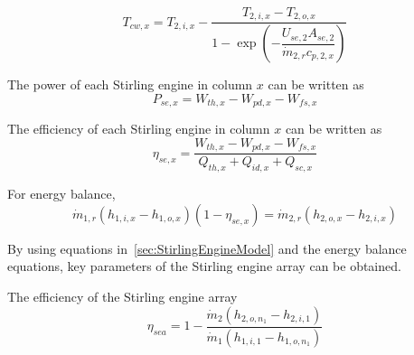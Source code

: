 \begin{equation}
	T_{cw,x}=T_{2,i,x}-\dfrac{T_{2,i,x}-T_{2,o,x}}{1-\exp(-\dfrac{U_{se,2}A_{se,2}}{\dot{m}_{2,r}c_{p,2,x}})}\label{eq:T_L_x}
\end{equation}

The power of each Stirling engine in column $x$ can be written as 
\begin{equation}
  P_{se,x} = W_{th,x}-W_{pd,x}-W_{fs,x}\end{equation}

The efficiency of each Stirling engine in column $x$ can be written as 
\begin{equation}
  \eta_{se,x} = \dfrac{W_{th,x}-W_{pd,x}-W_{fs,x}}{Q_{th,x}+Q_{id,x}+Q_{sc,x}}
\end{equation}



For energy balance,
\begin{equation}
	\dot{m}_{1,r}(h_{1,i,x}-h_{1,o,x})(1-\eta_{se,x})=\dot{m}_{2,r}(h_{2,o,x}-h_{2,i,x})
\end{equation}


By using equations in~\ref{sec:StirlingEngineModel} and the energy balance equations, key parameters of the Stirling engine array can be obtained. 

The efficiency of the Stirling engine array \begin{equation}
  \eta_{sea}=1-\dfrac{\dot{m}_{2}(h_{2,o,n_1}-h_{2,i,1})}{\dot{m}_{1}(h_{1,i,1}-h_{1,o,n_1})}
\end{equation}

